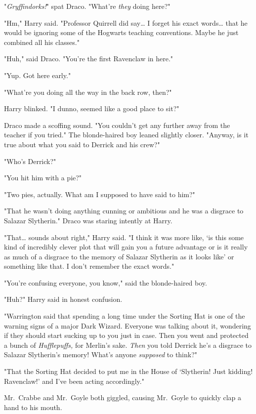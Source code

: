 "\emph{Gryffindorks!}" spat Draco. "What're \emph{they} doing here?"

"Hm," Harry said. "Professor Quirrell did say{\ldots} I forget his exact 
words{\ldots} that he would be ignoring some of the Hogwarts teaching 
conventions. Maybe he just combined all his classes."

"Huh," said Draco. "You're the first Ravenclaw in here."

"Yup. Got here early."

"What're you doing all the way in the back row, then?"

Harry blinked. "I dunno, seemed like a good place to sit?"

Draco made a scoffing sound. "You couldn't get any further away from the 
teacher if you tried." The blonde-haired boy leaned slightly closer. "Anyway, 
is it true about what you said to Derrick and his crew?"

"Who's Derrick?"

"You hit him with a pie?"

"Two pies, actually. What am I supposed to have said to him?"

"That he wasn't doing anything cunning or ambitious and he was a disgrace to 
Salazar Slytherin." Draco was staring intently at Harry.

"That{\ldots} sounds about right," Harry said. "I think it was more like, `is 
this some kind of incredibly clever plot that will gain you a future advantage 
or is it really as much of a disgrace to the memory of Salazar Slytherin as it 
looks like' or something like that. I don't remember the exact words."

"You're confusing everyone, you know," said the blonde-haired boy.

"Huh?" Harry said in honest confusion.

"Warrington said that spending a long time under the Sorting Hat is one of the 
warning signs of a major Dark Wizard. Everyone was talking about it, wondering 
if they should start sucking up to you just in case. Then you went and 
protected a bunch of \emph{Hufflepuffs,} for Merlin's sake. \emph{Then} you 
told Derrick he's a disgrace to Salazar Slytherin's memory! What's anyone 
\emph{supposed} to think?"

"That the Sorting Hat decided to put me in the House of `Slytherin! Just 
kidding! Ravenclaw!' and I've been acting accordingly."

Mr.~Crabbe and Mr.~Goyle both giggled, causing Mr.~Goyle to quickly clap a hand 
to his mouth.

